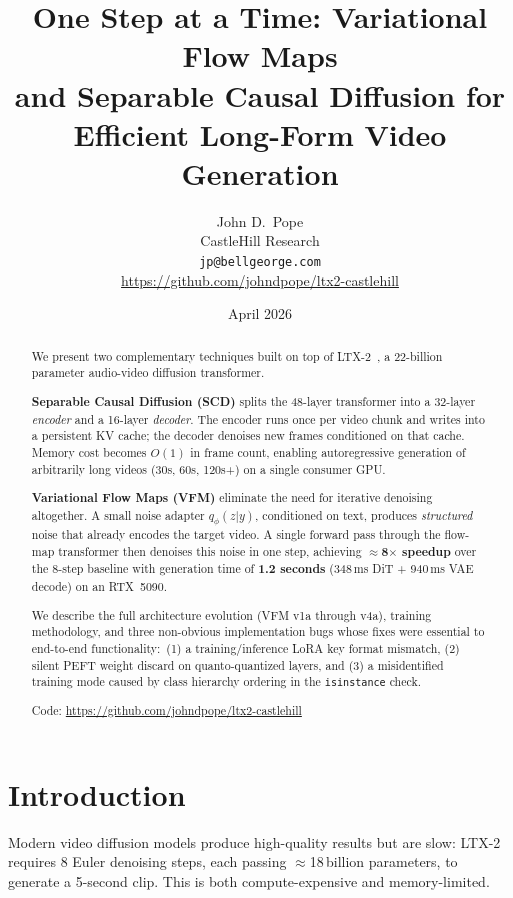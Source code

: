 \documentclass[10pt,twocolumn]{article}
\title{\textbf{One Step at a Time: Variational Flow Maps\\
and Separable Causal Diffusion for\\
Efficient Long-Form Video Generation}}
\author{
  John D.\ Pope\\
  CastleHill Research\\
  \texttt{jp@bellgeorge.com}\\
  \url{https://github.com/johndpope/ltx2-castlehill}
}
\date{April 2026}
\begin{document}
\maketitle

\begin{abstract}
We present two complementary techniques built on top of LTX-2~\cite{ltx2}, a 22-billion parameter audio-video diffusion transformer.

\textbf{Separable Causal Diffusion (SCD)} splits the 48-layer transformer into a 32-layer \emph{encoder} and a 16-layer \emph{decoder}. The encoder runs once per video chunk and writes into a persistent KV cache; the decoder denoises new frames conditioned on that cache. Memory cost becomes $O(1)$ in frame count, enabling autoregressive generation of arbitrarily long videos (30s, 60s, 120s+) on a single consumer GPU.

\textbf{Variational Flow Maps (VFM)} eliminate the need for iterative denoising altogether. A small noise adapter $q_\phi(z|y)$, conditioned on text, produces \emph{structured} noise that already encodes the target video. A single forward pass through the flow-map transformer then denoises this noise in one step, achieving \textbf{$\approx$8$\times$ speedup} over the 8-step baseline with generation time of \textbf{1.2 seconds} (348\,ms DiT + 940\,ms VAE decode) on an RTX~5090.

We describe the full architecture evolution (VFM v1a through v4a), training methodology, and three non-obvious implementation bugs whose fixes were essential to end-to-end functionality:\ (1) a training/inference LoRA key format mismatch, (2) silent PEFT weight discard on quanto-quantized layers, and (3) a misidentified training mode caused by class hierarchy ordering in the \texttt{isinstance} check.

Code: \url{https://github.com/johndpope/ltx2-castlehill}
\end{abstract}

\section{Introduction}
\label{sec:intro}

Modern video diffusion models produce high-quality results but are slow: LTX-2~\cite{ltx2} requires 8 Euler denoising steps, each passing $\approx$18\,billion parameters, to generate a 5-second clip. This is both compute-expensive and memory-limited.
\end{document}
